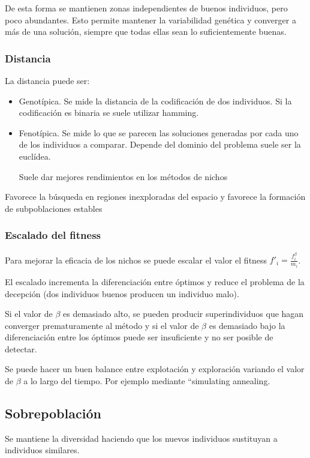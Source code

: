 \documentclass[12pt, twoside, openright]{report} %
\begin{document}
De esta forma se mantienen zonas independientes de buenos individuos, pero poco abundantes. Esto permite mantener la variabilidad genética y converger a más de una solución, siempre que todas ellas sean lo suficientemente buenas.

\subsubsection{Distancia}
La distancia puede ser:
\begin{itemize}
	\item Genotípica. Se mide la distancia de la codificación de dos individuos. Si la codificación es binaria se suele utilizar hamming.
	\item Fenotípica. Se mide lo que se parecen las soluciones generadas por cada uno de los individuos a comparar. Depende del dominio del problema suele ser la euclídea.
	
	Suele dar mejores rendimientos en los métodos de nichos
\end{itemize}

Favorece la búsqueda en regiones inexploradas del espacio y favorece la formación de subpoblaciones estables

\subsubsection{Escalado del fitness}
Para mejorar la eficacia de los nichos se puede escalar el valor el fitness $f'_i=\frac{f^\beta_i}{m_i}$.

El escalado incrementa la diferenciación entre óptimos y reduce el problema de la decepción (dos individuos buenos producen un individuo malo).

Si el valor de $\beta$ es demasiado alto, se pueden producir superindividuos que hagan converger prematuramente al método y si el valor de $\beta$ es demasiado bajo la diferenciación entre los óptimos puede ser insuficiente y no ser posible de detectar.

Se puede hacer un buen balance entre explotación y exploración variando el valor de $\beta$ a lo largo del tiempo. Por ejemplo mediante “simulating annealing.

\subsection{Sobrepoblación}
Se mantiene la diversidad haciendo que los nuevos individuos sustituyan a individuos similares.
\end{document}
